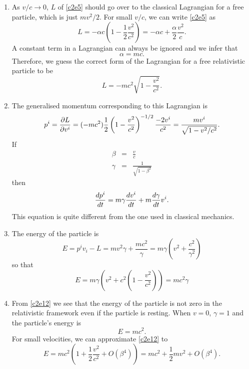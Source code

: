\begin{enumerate}
\item As $v/c \rightarrow 0$, $L$ of \eqref{c2e5} should go over to the classical
Lagrangian for a free particle, which is just $mv^2/2$. For small $v/c$, we can
write \eqref{c2e5} as
\[
L = -\alpha c\left(1 - \frac{1}{2}\frac{v^2}{c^2}\right) = 
-\alpha c + \frac{\alpha}{2}\frac{v^2}{c}.
\]
A constant term in a Lagrangian can always be ignored and we infer that
\begin{equation}\label{c2e6}
\alpha = mc.
\end{equation}
Therefore, we guess the correct form of the Lagrangian for a free relativistic
particle to be
\begin{equation}\label{c2e7}
L = -mc^2\sqrt{1 - \frac{v^2}{c^2}}.
\end{equation}

\item The generalised momentum corresponding to this Lagrangian is
\begin{equation}\label{c2e8}
p^i = \frac{\partial{L}}{\partial{v^i}} = (-mc^2)\frac{1}{2}\left(1 - \frac{v^2}{c^2}\right)^{-1/2}\frac{-2v^i}{c^2}
= \frac{mv^i}{\sqrt{1 - v^2/c^2}}.
\end{equation}
If
\begin{eqnarray}
\beta &=& \frac{v}{c} \\ \label{c2e9}
\gamma &=& \frac{1}{\sqrt{1 - \beta^2}} \label{c2e10}
\end{eqnarray}
then
\begin{equation}\label{c2e11}
\frac{d{p^i}}{d{t}} = m\gamma \frac{d{v^i}}{d{t}} + m\frac{d{\gamma}}{d{t}}v^i.
\end{equation}
This equation is quite different from the one used in classical mechanics.

\item The energy of the particle is
\[
E = p^i v_i - L = mv^2\gamma + \frac{mc^2}{\gamma} = m\gamma\left(v^2 + \frac{c^2}{\gamma^2}\right)
\]
so that
\begin{equation}\label{c2e12}
E = m\gamma\left(v^2 + c^2\left(1 - \frac{v^2}{c^2}\right)\right) 
= mc^2\gamma
\end{equation}

\item From \eqref{c2e12} we see that the energy of the particle is not zero in
the relativistic framework even if the particle is resting. When $v = 0$, $\gamma
= 1$ and the particle's energy is
\begin{equation}\label{c2e13}
E = mc^2.
\end{equation}
For small velocities, we can approximate \eqref{c2e12} to
\begin{equation}\label{c2e14}
E = mc^2\left(1 + \frac{1}{2}\frac{v^2}{c^2} + O(\beta^4)\right) = 
mc^2 + \frac{1}{2}mv^2 + O(\beta^4).
\end{equation}


\end{enumerate}
